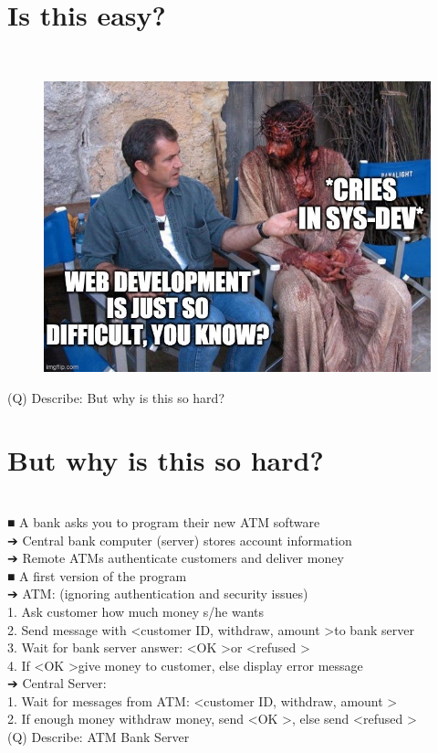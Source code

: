 \documentclass[12pt]{article}
\begin{document}
\section{Is this easy?}
\\
\begin{figure}[H]
\includegraphics[width=0.5\linewidth]{page17-image-1.png}
\end{figure}
\clearpage
(Q)
Describe: But why is this so hard?
\clearpage
\section{But why is this so hard?}
\\
■ A bank asks you to program their new ATM software\\
➔ Central bank computer (server) stores account information\\
➔ Remote ATMs authenticate customers and deliver money\\
■ A first version of the program\\
➔ ATM: (ignoring authentication and security issues)\\
1. Ask customer how much money s/he wants\\
2. Send message with  \textless customer ID, withdraw, amount \textgreater  to bank server\\
3. Wait for bank server answer:  \textless OK \textgreater  or  \textless refused \textgreater \\
4. If  \textless OK \textgreater  give money to customer, else display error message\\
➔ Central Server:\\
1. Wait for messages from ATM:  \textless customer ID, withdraw, amount \textgreater \\
2. If enough money withdraw money, send  \textless OK \textgreater , else send  \textless refused \textgreater \\
\clearpage
(Q)
Describe: ATM Bank Server
\clearpage
\end{document}
